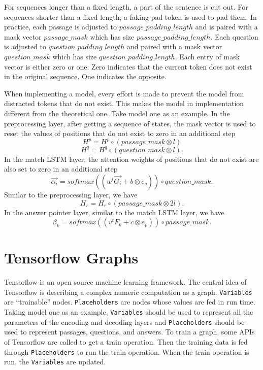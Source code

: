 \documentclass[modernstyle,12pt]{sjsuthesis}
\theoremstyle{definition}
\begin{document}
For sequences longer than a fixed length, a part of the sentence is cut out. For sequences shorter than a fixed length, a faking pad token is used to pad them. In practice, each passage is adjusted to $passage\_padding\_length$ and is paired with a mask vector $passage\_mask$ which has size $passage\_padding\_length$. Each question is adjusted to $question\_padding\_length$ and paired with a mask vector $question\_mask$ which has size $question\_padding\_length$. Each entry of mask vector is either zero or one. Zero indicates that the current token does not exist in the original sequence. One indicates the opposite.

When implementing a model, every effort is made to prevent the model from distracted tokens that do not exist. This makes the model in implementation different from the theoretical one. Take model one as an example. In the preprocessing layer, after getting a sequence of states, the mask vector is used to reset the values of positions that do not exist to zero in an additional step
$$H^p = H^p \circ (passage\_mask \otimes l)$$
$$H^q = H^q \circ (question\_mask \otimes l).$$
In the match LSTM layer, the attention weights of positions that do not exist are also set to zero in an additional step
$$\overrightarrow{\alpha _i} = softmax( (w^t\overrightarrow{G_i} + b \otimes e_q) ) \circ question\_mask .$$
Similar to the preprocessing layer, we have
$$H_r = H_r \circ (passage\_mask \otimes 2l).$$
In the answer pointer layer, similar to the match LSTM layer, we have
$$\beta _k = softmax( (v^tF_k + c \otimes e_p) ) \circ passage\_mask.$$


\section{Tensorflow Graphs}

Tensorflow is an open source machine learning framework. The central idea of Tensorflow is describing a complex numeric computation as a graph.  {\tt Variables} are ``trainable'' nodes.  {\tt Placeholders} are nodes whose values are fed in run time. Taking model one as an example,  {\tt Variables} should be used to represent all the parameters of the encoding and decoding layers and {\tt Placeholders} should be used to represent passages, questions, and answers. To train a graph, some APIs of Tensorflow are called to get a train operation. Then the training data is fed through {\tt Placeholders} to run the train operation. When the train operation is run, the {\tt Variables} are updated.
\end{document}
